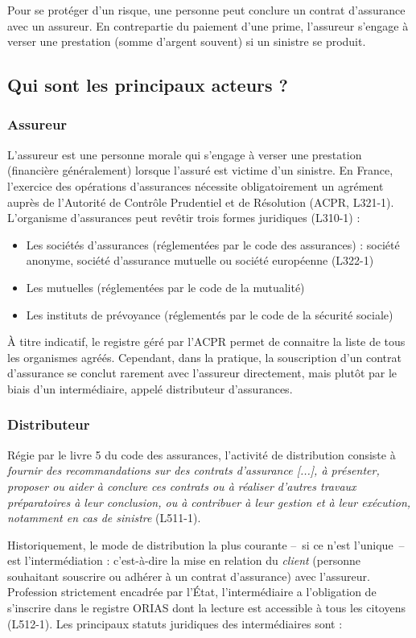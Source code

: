 \documentclass{article}
\begin{document}
Pour se protéger d'un risque, une personne peut conclure un contrat d'assurance avec un assureur. En contrepartie du paiement d'une prime, l'assureur s'engage à verser une prestation (somme d'argent souvent) si un sinistre se produit.

\subsection{Qui sont les principaux acteurs ?}
\subsubsection{Assureur}
L'assureur est une personne morale qui s'engage à verser une prestation (financière généralement) lorsque l'assuré est victime d'un sinistre. En France, l'exercice des opérations d'assurances nécessite obligatoirement un agrément auprès de l'Autorité de Contrôle Prudentiel et de Résolution (ACPR, L321-1). L'organisme d'assurances peut revêtir trois formes juridiques (L310-1) :
\begin{itemize}
    \item Les sociétés d'assurances (réglementées par le code des assurances) :  société anonyme, société d'assurance mutuelle ou société européenne (L322-1)
    \item Les mutuelles (réglementées par le code de la mutualité)
    \item Les instituts de prévoyance (réglementés par le code de la sécurité sociale)
\end{itemize}

À titre indicatif, le registre géré par l'ACPR permet de connaitre la liste de tous les organismes agréés. Cependant, dans la pratique, la souscription d'un contrat d'assurance se conclut rarement avec l'assureur directement, mais plutôt par le biais d'un intermédiaire, appelé distributeur d'assurances.

\subsubsection{Distributeur}
Régie par le livre 5 du code des assurances, l'activité de distribution consiste à \textit{fournir des recommandations sur des contrats d'assurance [...], à présenter, proposer ou aider à conclure ces contrats ou à réaliser d'autres travaux préparatoires à leur conclusion, ou à contribuer à leur gestion et à leur exécution, notamment en cas de sinistre} (L511-1).

Historiquement, le mode de distribution la plus courante --~si ce n'est l'unique~-- est l'intermédiation : c'est-à-dire la mise en relation du \textit{client} (personne souhaitant souscrire ou adhérer à un contrat d'assurance) avec l'assureur. Profession strictement encadrée par l'État, l'intermédiaire a l'obligation de s'inscrire dans le registre ORIAS dont la lecture est accessible à tous les citoyens (L512-1). Les principaux statuts juridiques des intermédiaires sont :
\end{document}
